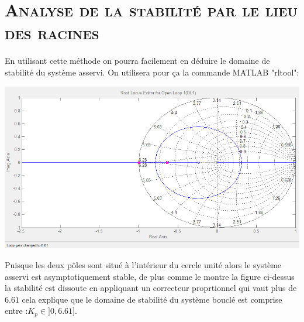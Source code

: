   \section{\textsc{Analyse de la stabilité par le lieu des racines}}
  
\par En utilisant cette méthode on pourra facilement en déduire le domaine de stabilité du système asservi. On utilisera pour ça la commande MATLAB "rltool":

	\begin{center}
	\includegraphics[scale=0.4]{rltool1.png}
	\label{fig12} 
	\end{center}

\par Puisque les deux pôles sont situé à l'intérieur du cercle unité alors le système asservi est asymptotiquement stable, de plus comme le montre la figure ci-dessus la stabilité est dissoute en appliquant un correcteur proprtionnel qui vaut plus de $ 6.61 $ cela explique que le domaine de stabilité du système bouclé est comprise entre :$K_p \in ]0,6.61]$.


